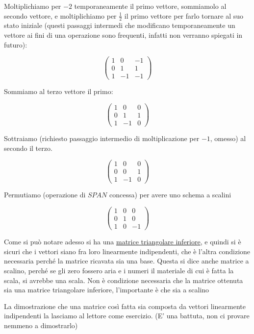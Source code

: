 \documentclass{article}
\begin{document}
Moltiplichiamo per $-2$ temporaneamente il primo vettore, sommiamolo al secondo vettore, e moltiplichiamo per $\frac{1}{2}$ il primo vettore per farlo tornare al suo stato iniziale (questi passaggi intermedi che modificano temporaneamente un vettore ai fini di una operazione sono frequenti, infatti non verranno spiegati in futuro):

\[\begin{pmatrix}
1 & 0 & -1 \\
0 & 1 & 1 \\
1 & -1 & -1
\end{pmatrix}\]

Sommiamo al terzo vettore il primo:

\[\begin{pmatrix}
1 & 0 & 0 \\
0 & 1 & 1 \\
1 & -1 & 0
\end{pmatrix}\]

Sottraiamo (richiesto passaggio intermedio di moltiplicazione per $-1$, omesso) al secondo il terzo.

\[\begin{pmatrix}
1 & 0 & 0 \\
0 & 0 & 1 \\
1 & -1 & 0
\end{pmatrix}\]

Permutiamo (operazione di \hyperref[def:funzione_span]{$SPAN$} concessa) per avere uno schema a scalini

\[\begin{pmatrix}
1 & 0 & 0 \\
0 & 1 & 0 \\
1 & 0 & -1
\end{pmatrix}\]

Come si può notare adesso si ha una \hyperref[def:matrice_triangolare_inferiore]{matrice triangolare inferiore}, e quindi si è sicuri che i vettori siano fra loro linearmente indipendenti, che è l'altra condizione necessaria perché la matrice ricavata sia una base. Questa si dice anche matrice a scalino, perché se gli zero fossero aria e i numeri il materiale di cui è fatta la scala, si avrebbe una scala. Non è condizione necessaria che la matrice ottenuta sia una matrice triangolare inferiore, l'importante è che sia a scalino

La dimostrazione che una matrice così fatta sia composta da vettori linearmente indipendenti la lasciamo al lettore come esercizio. (E' una battuta, non ci provare nemmeno a dimostrarlo)
\end{document}
